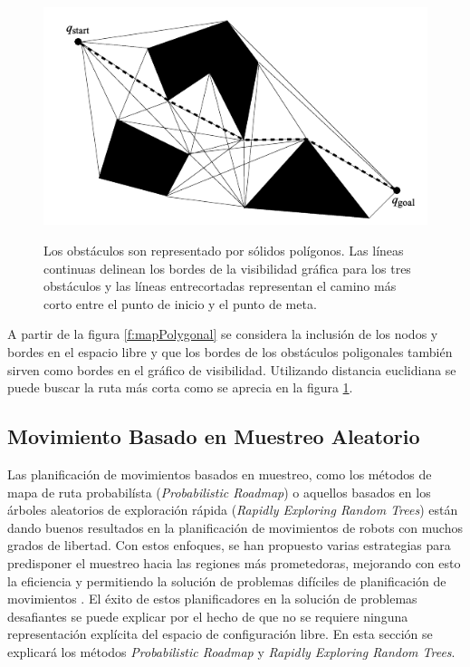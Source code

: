 \begin{figure}%
\centering \footnotesize
 {\includegraphics[width=0.60\linewidth]{images/shortPath_visibilityGraph.png}}
 \captionsetup{font=footnotesize}
 \caption{Los obst\'aculos son representado por s\'olidos pol\'igonos. Las 
 l\'ineas continuas delinean los bordes de la visibilidad gr\'afica para 
 los tres obst\'aculos y las l\'ineas entrecortadas representan el camino 
 m\'as corto entre el punto de inicio y el punto de meta.}
\label{f:shortVG}
\end{figure}

A partir de la figura \ref{f:mapPolygonal} se considera la inclusi\'on de 
los nodos y bordes en el espacio libre y que los bordes de los obst\'aculos 
poligonales tambi\'en sirven como bordes en el gr\'afico de 
visibilidad. Utilizando distancia euclidiana se puede buscar la ruta m\'as 
corta como se aprecia en la figura \ref{f:shortVG}.

\subsection{Movimiento Basado en Muestreo Aleatorio}

Las planificaci\'on de movimientos basados en muestreo, como los m\'etodos 
de mapa de ruta probabil\'ista (\textit{Probabilistic Roadmap}) o aquellos 
basados en los \'arboles aleatorios de exploraci\'on r\'apida 
(\textit{Rapidly Exploring Random Trees}) est\'an dando buenos resultados 
en la planificaci\'on de movimientos de robots con muchos grados de 
libertad. Con estos enfoques, se han propuesto varias estrategias para 
predisponer el muestreo hacia las regiones m\'as prometedoras, mejorando 
con esto la eficiencia y permitiendo la soluci\'on de problemas dif\'iciles 
de planificaci\'on de movimientos \cite{elbanhawi2014sampling}. El \'exito 
de estos planificadores en la soluci\'on de problemas desafiantes se puede 
explicar por el hecho de que no se requiere ninguna representaci\'on 
expl\'icita del espacio de configuraci\'on libre. En esta secci\'on se 
explicar\'a los m\'etodos \textit{Probabilistic Roadmap} y \textit{Rapidly 
Exploring Random Trees}.


